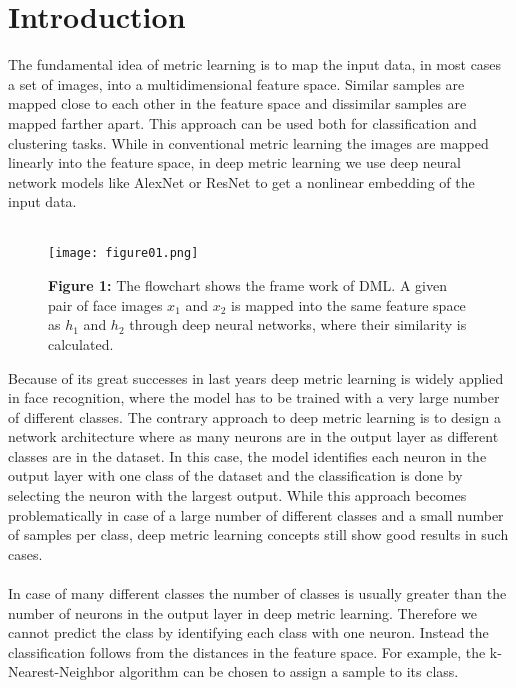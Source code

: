 \documentclass[12pt,paper=a4]{scrartcl}
\theoremstyle{break}
\begin{document}
\section{Introduction}
The fundamental idea of metric learning is to map the input data, in most cases a set of images, into a multidimensional feature space. Similar samples are mapped close to each other in the feature space and dissimilar samples are mapped farther apart. This approach can be used both for classification and clustering tasks. While in conventional metric learning the images are mapped linearly into the feature space, in deep metric learning we use deep neural network models like AlexNet or ResNet to get a nonlinear embedding of the input data. \\ \\
\begin{figure}[h]
	\centering
  \texttt{[image: figure01.png]}
  \caption{\textbf{Figure 1:} The flowchart shows the frame work of DML. A given pair of face images $x_1$ and $x_2$ is mapped into the same feature space as $h_1$ and $h_2$ through deep neural networks, where their similarity is calculated.\cite{source1}}
\end{figure}
Because of its great successes in last years deep metric learning is widely applied in face recognition, where the model has to be trained with a very large number of different classes. The contrary approach to deep metric learning is to design a network architecture where as many neurons are in the output layer as different classes are in the dataset. In this case, the model identifies each neuron in the output layer with one class of the dataset and the classification is done by selecting the neuron with the largest output. While this approach becomes problematically in case of a large number of different classes and a small number of samples per class, deep metric learning concepts still show good results in such cases. \\ \\
In case of many different classes the number of classes is usually greater than the number of neurons in the output layer in deep metric learning. Therefore we cannot predict the class by identifying each class with one neuron. Instead the classification follows from the distances in the feature space. For example, the k-Nearest-Neighbor algorithm can be chosen to assign a sample to its class. \\ \\
\end{document}

